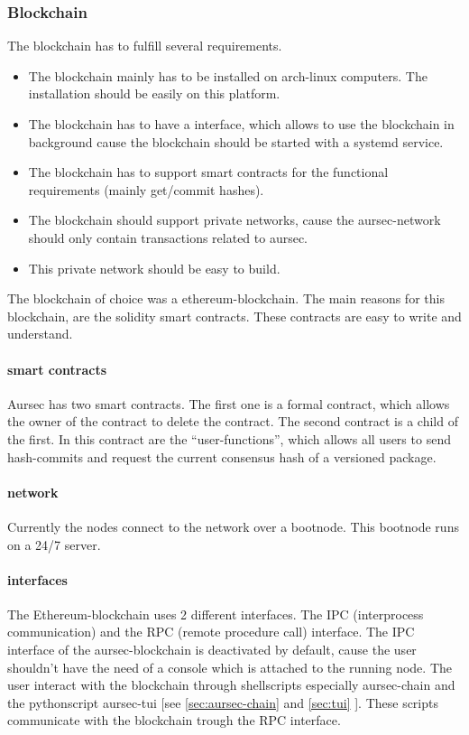 \subsubsection{Blockchain} \label{sec:blockchain}
The blockchain has to fulfill several requirements. %
\begin{itemize}
	\item The blockchain mainly has to be installed on arch-linux computers. The installation should be easily on this platform.
	\item The blockchain has to have a interface, which allows to use the blockchain in background cause the blockchain should be started with a systemd service.
	\item The blockchain has to support smart contracts for the functional requirements (mainly get/commit hashes).
	\item The blockchain should support private networks, cause the aursec-network should only contain transactions related to aursec.
	\item This private network should be easy to build.
\end{itemize}

The blockchain of choice was a ethereum-blockchain. The main reasons for this blockchain, are the solidity smart contracts. These contracts are easy to write and understand. 

\paragraph*{smart contracts}
Aursec has two smart contracts. The first one is a formal contract, which allows the owner of the contract to delete the contract. The second contract is a child of the first. In this contract are the ``user-functions'', which allows all users to send hash-commits and request the current consensus hash of a versioned package. 

\paragraph*{network}
Currently the nodes connect to the network over a bootnode. This bootnode runs on a 24/7 server.

\paragraph*{interfaces}
The Ethereum-blockchain uses 2 different interfaces. The IPC (interprocess communication) and the RPC (remote procedure call) interface. The IPC interface of the aursec-blockchain is deactivated by default, cause the user shouldn't have the need of a console which is attached to the running node. The user interact with the blockchain through shellscripts especially aursec-chain and the pythonscript aursec-tui [see \ref{sec:aursec-chain} and \ref{sec:tui} ]. These scripts communicate with the blockchain trough the RPC interface. 